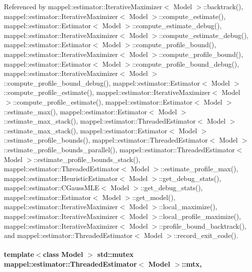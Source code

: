 Referenced by mappel\+::estimator\+::\+Iterative\+Maximizer$<$ Model $>$\+::backtrack(), mappel\+::estimator\+::\+Iterative\+Maximizer$<$ Model $>$\+::compute\+\_\+estimate(), mappel\+::estimator\+::\+Estimator$<$ Model $>$\+::compute\+\_\+estimate\+\_\+debug(), mappel\+::estimator\+::\+Iterative\+Maximizer$<$ Model $>$\+::compute\+\_\+estimate\+\_\+debug(), mappel\+::estimator\+::\+Estimator$<$ Model $>$\+::compute\+\_\+profile\+\_\+bound(), mappel\+::estimator\+::\+Iterative\+Maximizer$<$ Model $>$\+::compute\+\_\+profile\+\_\+bound(), mappel\+::estimator\+::\+Estimator$<$ Model $>$\+::compute\+\_\+profile\+\_\+bound\+\_\+debug(), mappel\+::estimator\+::\+Iterative\+Maximizer$<$ Model $>$\+::compute\+\_\+profile\+\_\+bound\+\_\+debug(), mappel\+::estimator\+::\+Estimator$<$ Model $>$\+::compute\+\_\+profile\+\_\+estimate(), mappel\+::estimator\+::\+Iterative\+Maximizer$<$ Model $>$\+::compute\+\_\+profile\+\_\+estimate(), mappel\+::estimator\+::\+Estimator$<$ Model $>$\+::estimate\+\_\+max(), mappel\+::estimator\+::\+Estimator$<$ Model $>$\+::estimate\+\_\+max\+\_\+stack(), mappel\+::estimator\+::\+Threaded\+Estimator$<$ Model $>$\+::estimate\+\_\+max\+\_\+stack(), mappel\+::estimator\+::\+Estimator$<$ Model $>$\+::estimate\+\_\+profile\+\_\+bounds(), mappel\+::estimator\+::\+Threaded\+Estimator$<$ Model $>$\+::estimate\+\_\+profile\+\_\+bounds\+\_\+parallel(), mappel\+::estimator\+::\+Threaded\+Estimator$<$ Model $>$\+::estimate\+\_\+profile\+\_\+bounds\+\_\+stack(), mappel\+::estimator\+::\+Threaded\+Estimator$<$ Model $>$\+::estimate\+\_\+profile\+\_\+max(), mappel\+::estimator\+::\+Heuristic\+Estimator$<$ Model $>$\+::get\+\_\+debug\+\_\+stats(), mappel\+::estimator\+::\+C\+Gauss\+M\+L\+E$<$ Model $>$\+::get\+\_\+debug\+\_\+stats(), mappel\+::estimator\+::\+Estimator$<$ Model $>$\+::get\+\_\+model(), mappel\+::estimator\+::\+Iterative\+Maximizer$<$ Model $>$\+::local\+\_\+maximize(), mappel\+::estimator\+::\+Iterative\+Maximizer$<$ Model $>$\+::local\+\_\+profile\+\_\+maximize(), mappel\+::estimator\+::\+Iterative\+Maximizer$<$ Model $>$\+::profile\+\_\+bound\+\_\+backtrack(), and mappel\+::estimator\+::\+Threaded\+Estimator$<$ Model $>$\+::record\+\_\+exit\+\_\+code().

\paragraph[{\texorpdfstring{mtx}{mtx}}]{\setlength{\rightskip}{0pt plus 5cm}template$<$class Model $>$ std\+::mutex {\bf mappel\+::estimator\+::\+Threaded\+Estimator}$<$ Model $>$\+::mtx\hspace{0.3cm}{\ttfamily [protected]}, {\ttfamily [inherited]}}\hypertarget{classmappel_1_1estimator_1_1ThreadedEstimator_af78695378590ff8e822dffe2b1b3f242}{}\label{classmappel_1_1estimator_1_1ThreadedEstimator_af78695378590ff8e822dffe2b1b3f242}


